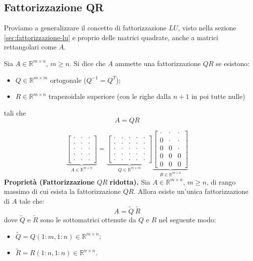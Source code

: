 \subsection{Fattorizzazione QR}
Proviamo a generalizzare il concetto di fattorizzazione $LU$, visto nella sezione \ref{sec:fattorizzazione-lu} e proprio delle matrici quadrate, anche a matrici rettangolari come $A$.
\begin{definition}
[Fattorizzazione $QR$]
Sia $A\in \mathbb{R}^{m\times n}$, $m\geqslant n$.
Si dice che $A$ ammette una fattorizzazione $QR$ se esistono:
\begin{itemize}
\item $Q\in \mathbb{R}^{m\times m}$ ortogonale ($Q^{-1} =Q^{T}$);
\item $R\in \mathbb{R}^{m\times n}$ trapezoidale superiore (con le righe dalla $n+1$ in poi tutte nulle) 
\end{itemize}
tali che $$A=QR$$
\end{definition}
\begin{equation*}
\underbrace{\begin{bmatrix}
\cdot  & \cdot  & \cdot \\
\cdot  & \cdot  & \cdot \\
\cdot  & \cdot  & \cdot \\
\cdot  & \cdot  & \cdot \\
\cdot  & \cdot  & \cdot
\end{bmatrix}}_{A\in \mathbb{R}^{m\times n}} =\underbrace{\begin{bmatrix}
\cdot  & \cdot  & \cdot  & \cdot  & \cdot \\
\cdot  & \cdot  & \cdot  & \cdot  & \cdot \\
\cdot  & \cdot  & \cdot  & \cdot  & \cdot \\
\cdot  & \cdot  & \cdot  & \cdot  & \cdot \\
\cdot  & \cdot  & \cdot  & \cdot  & \cdot
\end{bmatrix}}_{Q\in \mathbb{R}^{m\times m}}\underbrace{\begin{bmatrix}
\cdot  & \cdot  & \cdot \\
0 & \cdot  & \cdot \\
0 & 0 & \cdot \\
0 & 0 & 0\\
0 & 0 & 0
\end{bmatrix}}_{R\in \mathbb{R}^{m\times n}}
\end{equation*}
\textbf{Proprietà (Fattorizzazione }$QR$\textbf{ ridotta).}  Sia $A\in \mathbb{R}^{m\times n}$, $m\geqslant n$, di rango massimo di cui esista la fattorizzazione $QR$. Allora esiste un'unica fattorizzazione di $A$ tale che:
\begin{equation*}
A=\tilde{Q} \ \tilde{R}
\end{equation*}
dove $\tilde{Q}$ e $\tilde{R}$ sono le sottomatrici ottenute da $Q$ e $R$ nel seguente modo:
\begin{itemize}
\item $\tilde{Q} =Q( 1:m,1:n) \in \mathbb{R}^{m\times n}$;
\item $\tilde{R} =R( 1:n,1:n) \in \mathbb{R}^{n\times n}$.
\end{itemize}


